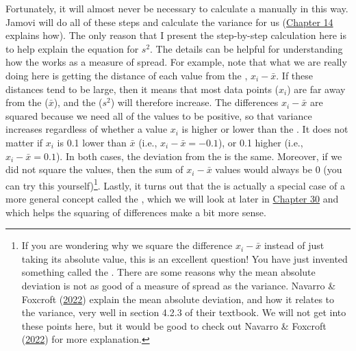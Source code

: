 \documentclass[
  openany]{krantz}
\begin{document}
Fortunately, it will almost never be necessary to calculate a  manually in this way.
Jamovi will do all of these steps and calculate the variance for us (\protect\hyperlink{Chapter_14}{Chapter 14} explains how).
The only reason that I present the step-by-step calculation here is to help explain the equation for \(s^{2}\).
The details can be helpful for understanding how the  works as a measure of spread.
For example, note that what we are really doing here is getting the distance of each value from the , \(x_{i} - \bar{x}\).
If these distances tend to be large, then it means that most data points (\(x_{i}\)) are far away from the  (\(\bar{x}\)), and the  (\(s^{2}\)) will therefore increase.
The differences \(x_{i} - \bar{x}\) are squared because we need all of the values to be positive, so that variance increases regardless of whether a value \(x_{i}\) is higher or lower than the .
It does not matter if \(x_{i}\) is 0.1 lower than \(\bar{x}\) (i.e., \(x_{i} - \bar{x} = -0.1\)), or 0.1 higher (i.e., \(x_{i} - \bar{x} = 0.1\)).
In both cases, the deviation from the  is the same.
Moreover, if we did not square the values, then the sum of \(x_{i} - \bar{x}\) values would always be 0 (you can try this yourself)\footnote{If you are wondering why we square the difference \(x_{i} - \bar{x}\) instead of just taking its absolute value, this is an excellent question! You have just invented something called the . There are some reasons why the mean absolute deviation is not as good of a measure of spread as the variance. Navarro \& Foxcroft (\protect\hyperlink{ref-Navarro2022}{2022}) explain the mean absolute deviation, and how it relates to the variance, very well in section 4.2.3 of their textbook. We will not get into these points here, but it would be good to check out Navarro \& Foxcroft (\protect\hyperlink{ref-Navarro2022}{2022}) for more explanation.}.
Lastly, it turns out that the  is actually a special case of a more general concept called the \emph{}, which we will look at later in \protect\hyperlink{Chapter_30}{Chapter 30} and which helps the squaring of differences make a bit more sense.
\end{document}
